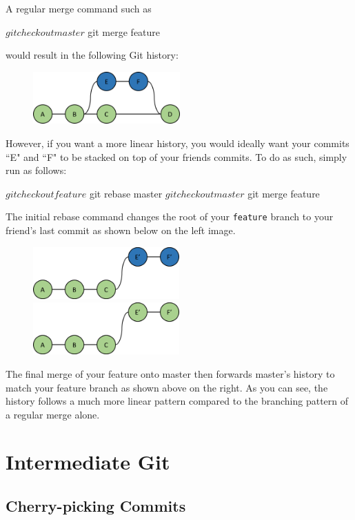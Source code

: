 \documentclass[12pt]{report}
\begin{document}
A regular merge command such as
\begin{blockcode}
$ git checkout master
$ git merge feature
\end{blockcode}
would result in the following Git history:
\begin{figure}[h]
\center
\includegraphics[height=2cm]{merge}
\end{figure}

However, if you want a more linear history, you would ideally want your commits ``E" and ``F" to be stacked on top of your friends commits.  To do as such, simply run as follows:
\begin{blockcode}
$ git checkout feature
$ git rebase master
$ git checkout master
$ git merge feature
\end{blockcode}

The initial rebase command changes the root of your \texttt{feature} branch to your friend's last commit as shown below on the left image.

\begin{figure}[h]
\center
\includegraphics[height=2cm]{rebase}
\includegraphics[height=2cm]{rebase_merge}
\end{figure}

The final merge of your feature onto master then forwards master's history to match your feature branch as shown above on the right.  As you can see, the history follows a much more linear pattern compared to the branching pattern of a regular merge alone.

\chapter{Intermediate Git}
\section{Cherry-picking Commits}
\end{document}
